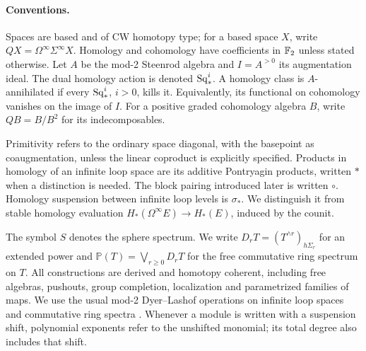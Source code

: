 \paragraph{Conventions.}
Spaces are based and of CW homotopy type; for a based space \(X\),
write \(QX=\Omega^\infty\Sigma^\infty X\).
Homology and cohomology have coefficients in \(\mathbb F_2\) unless stated
otherwise. Let \(A\) be the mod-2 Steenrod algebra and \(I=A^{>0}\)
its augmentation ideal. The dual homology action is denoted
\(\operatorname{Sq}_*^i\). A homology class is \(A\)-annihilated if every
\(\operatorname{Sq}_*^i\), \(i>0\), kills it. Equivalently, its functional on
cohomology vanishes on the image of \(I\). For a positive graded
cohomology algebra \(B\), write \(Q B=B/B^2\) for its
indecomposables.

Primitivity refers to the ordinary space diagonal, with the basepoint
as coaugmentation, unless the linear coproduct is explicitly specified.
Products in homology of an infinite loop
space are its additive Pontryagin products, written \(*\) when a
distinction is needed. The block pairing introduced later is written
\(\circ\). Homology suspension between infinite loop levels is
\(\sigma_*\). We distinguish it from stable homology evaluation
\(H_*(\Omega^\infty E)\to H_*(E)\), induced by the counit.

\begin{samepage}
The symbol \(S\) denotes the sphere spectrum. We write
\(D_rT=(T^{\wedge r})_{h\Sigma_r}\) for an extended power and
\(\mathbb P(T)=\bigvee_{r\ge0}D_rT\) for the free commutative ring
spectrum on \(T\).
All constructions are derived and homotopy coherent, including free
algebras, pushouts, group completion, localization and parametrized
families of maps. We use the usual mod-2 Dyer--Lashof operations on
infinite loop spaces and commutative ring spectra
\cite{CLM1976,BMMS1986}. Whenever a module is written with a suspension
shift, polynomial exponents refer to the unshifted monomial; its total
degree also includes that shift.
\par
\end{samepage}
